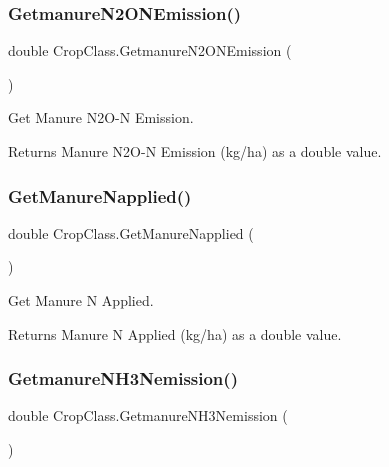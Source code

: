 \subsubsection{\texorpdfstring{GetmanureN2ONEmission()}{GetmanureN2ONEmission()}}
{\footnotesize\ttfamily double Crop\+Class.\+Getmanure\+N2\+O\+N\+Emission (\begin{DoxyParamCaption}{ }\end{DoxyParamCaption})\hspace{0.3cm}{\ttfamily [inline]}}



Get Manure N2\+O-\/N Emission. 

\begin{DoxyReturn}{Returns}
Manure N2\+O-\/N Emission (kg/ha) as a double value. 
\end{DoxyReturn}
\mbox{\label{class_crop_class_a6e0998fc257ff97443ea945226a12f89}} 
\subsubsection{\texorpdfstring{GetManureNapplied()}{GetManureNapplied()}}
{\footnotesize\ttfamily double Crop\+Class.\+Get\+Manure\+Napplied (\begin{DoxyParamCaption}{ }\end{DoxyParamCaption})\hspace{0.3cm}{\ttfamily [inline]}}



Get Manure N Applied. 

\begin{DoxyReturn}{Returns}
Manure N Applied (kg/ha) as a double value. 
\end{DoxyReturn}
\mbox{\label{class_crop_class_aa532ea6df8a69a2d0b44a42ce7d862e1}} 
\subsubsection{\texorpdfstring{GetmanureNH3Nemission()}{GetmanureNH3Nemission()}}
{\footnotesize\ttfamily double Crop\+Class.\+Getmanure\+N\+H3\+Nemission (\begin{DoxyParamCaption}{ }\end{DoxyParamCaption})\hspace{0.3cm}{\ttfamily [inline]}}



